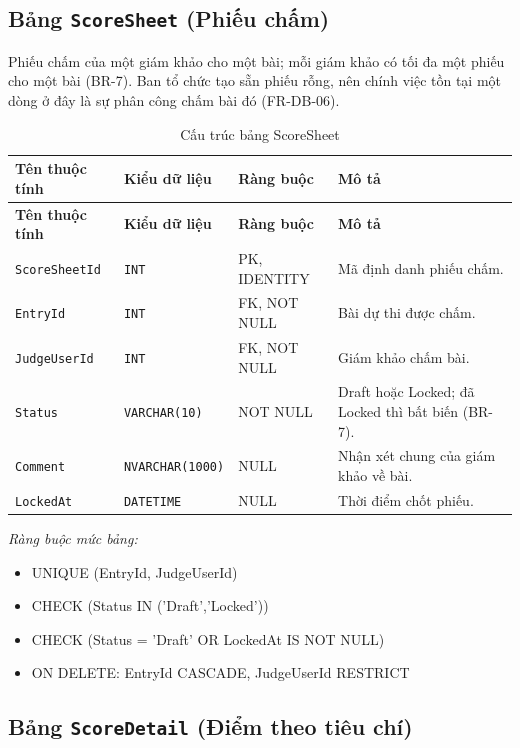 \subsection{Bảng \texttt{ScoreSheet} (Phiếu chấm)}

Phiếu chấm của một giám khảo cho một bài; mỗi giám khảo có tối đa một phiếu cho một bài (BR-7). Ban tổ chức tạo sẵn phiếu rỗng, nên chính việc tồn tại một dòng ở đây là sự phân công chấm bài đó (FR-DB-06).

\begin{longtable}{|L{4cm}|L{3.15cm}|L{2.4cm}|L{4.55cm}|}
\caption{Cấu trúc bảng ScoreSheet} \\
\hline
\textbf{Tên thuộc tính} & \textbf{Kiểu dữ liệu} & \textbf{Ràng buộc} & \textbf{Mô tả} \\ \hline
\endfirsthead
\hline
\textbf{Tên thuộc tính} & \textbf{Kiểu dữ liệu} & \textbf{Ràng buộc} & \textbf{Mô tả} \\ \hline
\endhead
\texttt{ScoreSheetId} & \texttt{INT} & PK, IDENTITY & Mã định danh phiếu chấm. \\ \hline
\texttt{EntryId} & \texttt{INT} & FK, NOT NULL & Bài dự thi được chấm. \\ \hline
\texttt{JudgeUserId} & \texttt{INT} & FK, NOT NULL & Giám khảo chấm bài. \\ \hline
\texttt{Status} & \texttt{VARCHAR(10)} & NOT NULL & Draft hoặc Locked; đã Locked thì bất biến (BR-7). \\ \hline
\texttt{Comment} & \texttt{NVARCHAR(1000)} & NULL & Nhận xét chung của giám khảo về bài. \\ \hline
\texttt{LockedAt} & \texttt{DATETIME} & NULL & Thời điểm chốt phiếu. \\ \hline
\end{longtable}

\noindent\textit{Ràng buộc mức bảng:}

\begin{itemize}\raggedright
    \item UNIQUE (EntryId,\allowbreak{} JudgeUserId)
    \item CHECK (Status IN ('Draft',\allowbreak{}'Locked'))
    \item CHECK (Status = 'Draft' OR LockedAt IS NOT NULL)
    \item ON DELETE: EntryId CASCADE,\allowbreak{} JudgeUserId RESTRICT
\end{itemize}

\subsection{Bảng \texttt{ScoreDetail} (Điểm theo tiêu chí)}

